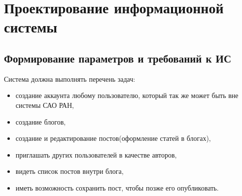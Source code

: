 \section{Проектирование информационной системы}

\subsection{Формирование параметров и требований к ИС}

Система должна выполнять перечень задач:
\begin{itemize}
	\item создание аккаунта любому пользователю, который так же может быть вне системы САО РАН, 
	\item создание блогов,
	\item создание и редактирование постов(оформление статей в блогах),
	\item приглашать других пользователей в качестве авторов,
	\item видеть список постов внутри блога,
	\item иметь возможность сохранить пост, чтобы позже его опубликовать. 
\end{itemize}


\pagebreak